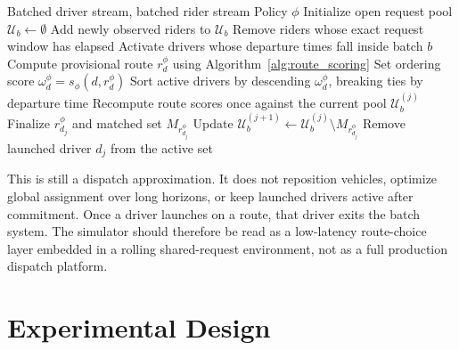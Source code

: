 \documentclass[journal]{IEEEtran}
\begin{document}
\begin{algorithm}[!t]
\caption{Rolling-horizon dispatch with one-step conflict recomputation}
\label{alg:dispatch}
\footnotesize
\begin{algorithmic}[1]
\Require Batched driver stream, batched rider stream
\Statex \hspace{\algorithmicindent} Policy \(\phi\)
\State Initialize open request pool \(\mathcal{U}_b \gets \emptyset\)
    \State Add newly observed riders to \(\mathcal{U}_b\)
    \State Remove riders whose exact request window has elapsed
    \State Activate drivers whose departure times fall inside batch \(b\)
        \State Compute provisional route \(r_d^\phi\) using Algorithm~\ref{alg:route_scoring}
        \State Set ordering score \(\omega_d^\phi=s_\phi(d,r_d^\phi)\)
    \EndFor
    \State Sort active drivers by descending \(\omega_d^\phi\), breaking ties by departure time
        \State Recompute route scores once against the current pool \(\mathcal{U}_b^{(j)}\)
        \State Finalize \(r_{d_j}^{\phi}\) and matched set \(M_{r_{d_j}^{\phi}}\)
        \State Update \(\mathcal{U}_b^{(j+1)} \gets \mathcal{U}_b^{(j)} \setminus M_{r_{d_j}^{\phi}}\)
        \State Remove launched driver \(d_j\) from the active set
    \EndFor
\EndFor
\end{algorithmic}
\end{algorithm}

This is still a dispatch approximation. It does not reposition vehicles, optimize global assignment over long horizons, or keep launched drivers active after commitment. Once a driver launches on a route, that driver exits the batch system. The simulator should therefore be read as a low-latency route-choice layer embedded in a rolling shared-request environment, not as a full production dispatch platform.

\section{Experimental Design}
\end{document}
